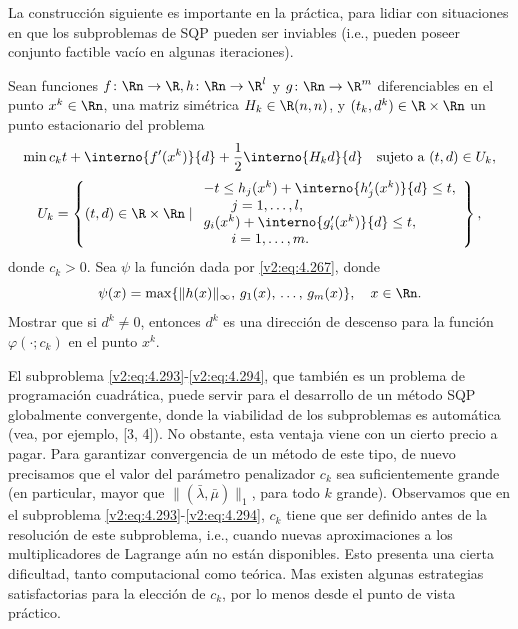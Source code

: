 La construcción siguiente es importante en la práctica, para lidiar con situaciones en que los subproblemas de SQP pueden ser inviables (i.e., pueden poseer conjunto factible vacío en algunas iteraciones).

\begin{exercise}\label{v2:ejer:4.6.4}
Sean funciones $f \colon \Rn \to \R, h \colon \Rn \to \R^l$ y $g \colon \Rn \to \R^m$ diferenciables en el punto $x^k \in \Rn$, una matriz simétrica $H_k \in \R(n,n)$, y $(t_k, d^k) \in \R \times \Rn$ un punto estacionario del problema
\begin{equation}
\min c_k t + \interno{f'(x^k)}{d} + \frac{1}{2} \interno{H_k d}{d} \quad \text{sujeto a } (t, d) \in U_k,
\label{v2:eq:4.293}
\end{equation}
\begin{equation}
U_k = \left\{ (t, d) \in \R \times \Rn \mid \begin{array}{l} -t \le h_j(x^k) + \interno{h'_j(x^k)}{d} \le t, \\ \quad \quad j = 1, \dots, l, \\ g_i(x^k) + \interno{g'_i(x^k)}{d} \le t, \\ \quad \quad i = 1, \dots, m. \end{array} \right\},
\label{v2:eq:4.294}
\end{equation}
donde $c_k > 0$. Sea $\psi$ la función dada por \eqref{v2:eq:4.267}, donde
\begin{equation}
\psi(x) = \max\{\|h(x)\|_\infty, \, g_1(x), \, \dots, \, g_m(x)\}, \quad x \in \Rn.
\label{v2:eq:4.295}
\end{equation}
Mostrar que si $d^k \neq 0$, entonces $d^k$ es una dirección de descenso para la función $\varphi(\cdot; c_k)$ en el punto $x^k$.
\end{exercise}

El subproblema \eqref{v2:eq:4.293}-\eqref{v2:eq:4.294}, que también es un problema de programación cuadrática, puede servir para el desarrollo de un método SQP globalmente convergente, donde la viabilidad de los subproblemas es automática (vea, por ejemplo, [3, 4]). No obstante, esta ventaja viene con un cierto precio a pagar. Para garantizar convergencia de un método de este tipo, de nuevo precisamos que el valor del parámetro penalizador $c_k$ sea suficientemente grande (en particular, mayor que $\|(\bar{\lambda}, \bar{\mu})\|_1$, para todo $k$ grande). Observamos que en el subproblema \eqref{v2:eq:4.293}-\eqref{v2:eq:4.294}, $c_k$ tiene que ser definido antes de la resolución de este subproblema, i.e., cuando nuevas aproximaciones a los multiplicadores de Lagrange aún no están disponibles. Esto presenta una cierta dificultad, tanto computacional como teórica. Mas existen algunas estrategias satisfactorias para la elección de $c_k$, por lo menos desde el punto de vista práctico.


